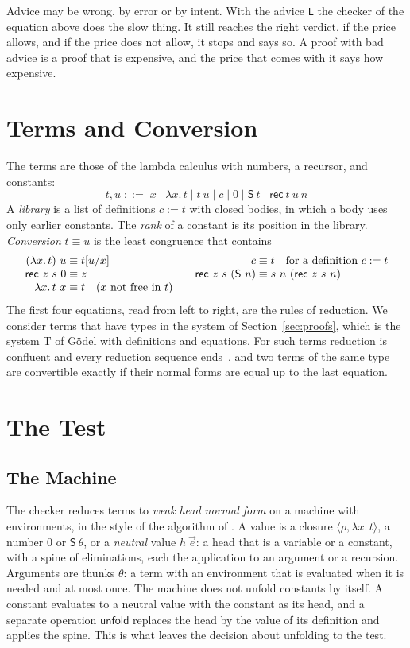 \documentclass[acmsmall,nonacm,screen]{acmart}
\newcommand{\kw}[1]{\mathsf{#1}}
\newcommand{\lamx}[1]{\lambda #1.\,}
\newcommand{\rec}{\kw{rec}}
\newcommand{\suc}{\kw{S}}
\newcommand{\conv}{\equiv}
\newcommand{\adv}[1]{\textup{\texttt{#1}}}
\begin{document}
Advice may be wrong, by error or by intent. With the advice \adv{L} the checker of the
equation above does the slow thing. It still reaches the right verdict, if the price allows,
and if the price does not allow, it stops and says so. A proof with bad advice is a proof
that is expensive, and the price that comes with it says how expensive.

\section{Terms and Conversion}
\label{sec:terms}

The terms are those of the lambda calculus with numbers, a recursor, and constants:
\[
  t, u \;::=\; x \mid \lamx{x} t \mid t\ u \mid c \mid 0 \mid \suc\ t \mid \rec\ t\ u\ n
\]
A \emph{library} is a list of definitions $c := t$ with closed bodies, in which a body uses
only earlier constants. The \emph{rank} of a constant is its position in the library.
\emph{Conversion} $t \conv u$ is the least congruence that contains
\[
\begin{array}{r@{\;\conv\;}l@{\qquad}r@{\;\conv\;}l}
  (\lamx{x} t)\ u & t[u/x] & c & t \quad \text{for a definition } c := t \\
  \rec\ z\ s\ 0 & z & \rec\ z\ s\ (\suc\ n) & s\ n\ (\rec\ z\ s\ n) \\
  \lamx{x} t\ x & t \quad (x \text{ not free in } t)
\end{array}
\]
The first four equations, read from left to right, are the rules of reduction. We consider
terms that have types in the system of Section~\ref{sec:proofs}, which is the system T of
G\"odel with definitions and equations. For such terms reduction is confluent and every
reduction sequence ends~\cite{tait1967}, and two terms of the same type are convertible
exactly if their normal forms are equal up to the last equation.

\section{The Test}
\label{sec:test}

\subsection{The Machine}

The checker reduces terms to \emph{weak head normal form} on a machine with environments, in
the style of the algorithm of \citet{coquand1996}. A value is a closure $\langle \rho, \lamx{x}
t\rangle$, a number $0$ or $\suc\ \theta$, or a \emph{neutral} value $h\ \vec{e}$: a head that
is a variable or a constant, with a spine of eliminations, each the application to an
argument or a recursion. Arguments are thunks $\theta$: a term with an environment that is
evaluated when it is needed and at most once. The machine does not unfold constants by
itself. A constant evaluates to a neutral value with the constant as its head, and a separate
operation $\kw{unfold}$ replaces the head by the value of its definition and applies the
spine. This is what leaves the decision about unfolding to the test.
\end{document}
